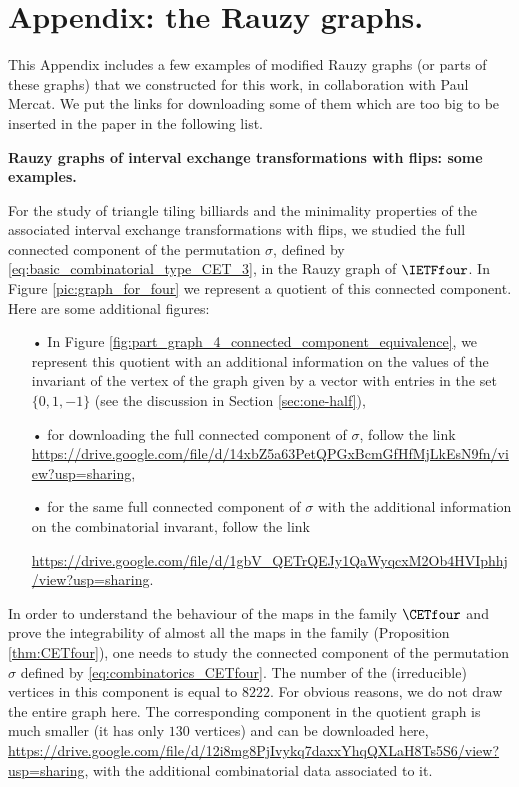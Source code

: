 \documentclass[12pt]{article}
\theoremstyle{definition}
\begin{document}
\section{Appendix: the Rauzy graphs.}
This Appendix includes a few examples of modified Rauzy graphs (or parts of these graphs) that we constructed for this work, in collaboration with Paul Mercat. We put the links for downloading some of them which are too big to be inserted in the paper in the following list.

\begin{center}
\textbf{Rauzy graphs of interval exchange transformations with flips: some examples.}
\end{center}


For the study of triangle tiling billiards and the minimality properties of the associated interval exchange transformations with flips, we studied the full connected component of the permutation $\sigma$, defined by \eqref{eq:basic_combinatorial_type_CET_3}, in the Rauzy graph of $\IETFfour$. In Figure \ref{pic:graph_for_four} we represent a quotient of this connected component. Here are some additional figures:
\begin{itemize}
\item[•] In Figure \ref{fig:part_graph_4_connected_component_equivalence}, we represent this quotient with an additional information on the values of the invariant of the vertex of the graph given by a vector with entries in the set $\{0,1,-1\}$ (see the discussion in Section \ref{sec:one-half}),
\item[•] for downloading the full connected component of $\sigma$, follow the link \url{https://drive.google.com/file/d/14xbZ5a63PetQPGxBcmGfHfMjLkEsN9fn/view?usp=sharing},
\item[•] for the same full connected component of $\sigma$ with the additional information on the combinatorial invarant, follow the link 

\url{https://drive.google.com/file/d/1gbV_QETrQEJy1QaWyqcxM2Ob4HVIphhj/view?usp=sharing}.
\end{itemize}


In order to understand the behaviour of the maps in the family $\CETfour$ and prove the integrability of almost all the maps in the family (Proposition \ref{thm:CETfour}), one needs to study the connected component of the permutation $\sigma$ defined by \eqref{eq:combinatorics_CETfour}. The number of the (irreducible) vertices in this component is equal to $8 222$. For obvious reasons, we do not draw the entire graph here. The corresponding component in the quotient graph is much smaller (it has only $130$ vertices) and can be downloaded here, 
\url{https://drive.google.com/file/d/12i8mg8PjIvykq7daxxYhqQXLaH8Ts5S6/view?usp=sharing}, with the additional combinatorial data associated to it.
\end{document}
